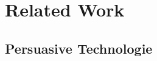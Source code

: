 
\chapter{Related Work} %

\label{relatedworkchapter} %


\section{Persuasive Technologie}

\begin{flushright}
\end{flushright}
